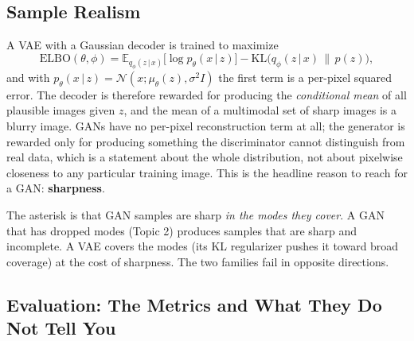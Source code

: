 \documentclass[11pt]{article}
\newcommand{\E}{\mathbb{E}}
\newcommand{\KL}{\mathrm{KL}}
\newcommand{\given}{\,\vert\,}
\theoremstyle{remark}
\begin{document}
\subsection{Sample Realism}

A VAE with a Gaussian decoder is trained to maximize
\[
\mathrm{ELBO}(\theta,\phi) = \E_{q_\phi(z\given x)}\big[\log p_\theta(x\given z)\big] - \KL\big(q_\phi(z\given x)\,\|\,p(z)\big),
\]
and with $p_\theta(x\given z)=\mathcal{N}(x;\mu_\theta(z),\sigma^2 I)$ the first term is a per-pixel squared error. The decoder is therefore rewarded for producing the \emph{conditional mean} of all plausible images given $z$, and the mean of a multimodal set of sharp images is a blurry image. GANs have no per-pixel reconstruction term at all; the generator is rewarded only for producing something the discriminator cannot distinguish from real data, which is a statement about the whole distribution, not about pixelwise closeness to any particular training image. This is the headline reason to reach for a GAN: \textbf{sharpness}.

The asterisk is that GAN samples are sharp \emph{in the modes they cover}. A GAN that has dropped modes (Topic 2) produces samples that are sharp and incomplete. A VAE covers the modes (its KL regularizer pushes it toward broad coverage) at the cost of sharpness. The two families fail in opposite directions.

\subsection{Evaluation: The Metrics and What They Do Not Tell You}
\end{document}
